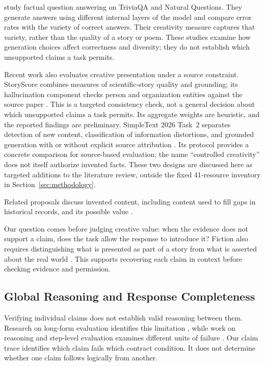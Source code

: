 \documentclass{clv2025}
\begin{document}
\citet{he_shakespearean_2025} study factual question answering on TriviaQA
and Natural Questions. They generate answers using different internal
layers of the model and compare error rates with the variety of correct
answers. Their creativity measure captures that variety, rather than the
quality of a story or poem. These studies examine how generation choices
affect correctness and diversity; they do not establish which unsupported
claims a task permits.

Recent work also evaluates creative presentation under a source constraint.
StoryScore combines measures of scientific-story quality and grounding; its
hallucination component checks person and organization entities against the
source paper \citep{argese_storyscore_2026}. This is a targeted consistency
check, not a general decision about which unsupported claims a task permits.
Its aggregate weights are heuristic, and the reported findings are preliminary.
SimpleText 2026 Task~2 separates detection of new content, classification of
information distortions, and grounded generation with or without explicit
source attribution \citep{simpletext_task2_2026}. Its protocol provides a
concrete comparison for source-based evaluation; the name ``controlled
creativity'' does not itself authorize invented facts. These two designs
are discussed here as targeted additions to the literature review, outside
the fixed 41-resource inventory in Section~\ref{sec:methodology}.

Related proposals discuss invented content, including content used to fill
gaps in historical records, and its possible value
\citep{sui_confabulation_2024,sui_critical_2025,yang_hicbench_2025}.

Our question comes before judging creative value: when the evidence does not
support a claim, does the task allow the response to introduce it? Fiction
also requires distinguishing what is presented as part of a story from what
is asserted about the real world \citep{searle_logical_1975}. This supports
recovering each claim in context before checking evidence and permission.

\subsection{Global Reasoning and Response Completeness}\label{subsec:global}

Verifying individual claims does not establish valid reasoning between them.
Research on long-form evaluation identifies this limitation
\citep{yan_logicscore_2026}, while work on reasoning and step-level evaluation
examines different units of failure
\citep{arcuschin_cot_2025,pham_grace_2026}.
Our claim trace identifies which claim fails which contract condition. It
does not determine whether one claim follows logically from another.
\end{document}

